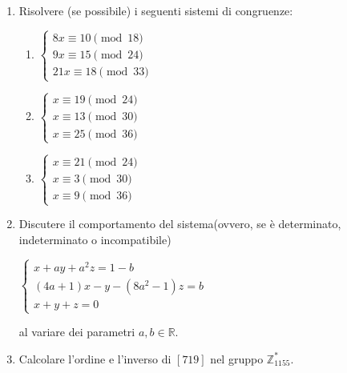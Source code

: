 \documentclass[fleqn]{article}
\begin{document}
\begin{enumerate}
   \item Risolvere (se possibile) i seguenti sistemi di congruenze:
   
   \begin{enumerate} 
      \item \begin{center} 
      $ \begin{cases}
         8x \equiv 10 \pmod{18} \\
         9x \equiv 15 \pmod{24} \\
         21x \equiv 18 \pmod{33} 
      \end{cases} $
      \end{center}
      \item \begin{center} 
      $ \begin{cases}
         x \equiv 19 \pmod{24} \\
         x \equiv 13 \pmod{30} \\
         x \equiv 25 \pmod{36} 
      \end{cases} $
      \end{center}
      \item \begin{center}
      $ \begin{cases}
         x \equiv 21 \pmod{24} \\
         x \equiv 3 \pmod{30} \\
         x \equiv 9 \pmod{36} 
      \end{cases} $
      \end{center}
   \end{enumerate}

   \item Discutere il comportamento del sistema(ovvero, se è determinato, indeterminato o incompatibile)
   \begin{center}
   $\begin{cases} 
      x+ay+a^2z=1-b \\
      (4a+1)x-y-(8a^2-1)z=b \\
      x+y+z = 0
   \end{cases}$ \\
   \end{center}
   al variare dei parametri $a,b \in \mathbb{R}$.

   \item Calcolare l'ordine e l'inverso di $[719]$ nel gruppo $\mathbb{Z}_{1155}^*$.


\end{enumerate}
\end{document}
